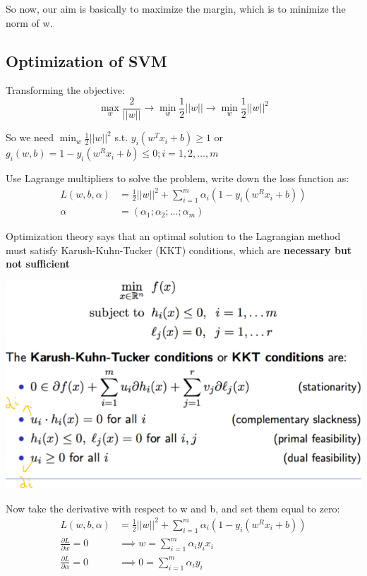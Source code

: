 \documentclass[letterpaper,12pt]{article}
\begin{document}
So now, our aim is basically to maximize the margin, which is to minimize the
norm of w.

\subsection{Optimization of SVM}

Transforming the objective:
\[
    \max_w\frac{2}{||w||}\to \min_w \frac{1}{2}||w|| \to \min_w \frac{1}{2}||w||^2
\]

So we need $\min_w \frac{1}{2}||w||^2$ s.t. $y_i(w^T x_i +b)\ge 1$ or $g_i
    (w,b) = 1 - y_i (w^R x_i +b)\le 0; i = 1,2,\ldots , m$

Use Lagrange multipliers to solve the problem, write down the loss function as:
\begin{align*}
    L(w,b,\alpha) & = \frac{1}{2}||w||^2 + \sum_{i=1}^{m}\alpha_i (1 - y_i (w^R x_i +b)) \\
    \alpha        & = (\alpha_1;\alpha_2;\ldots;\alpha_m)
\end{align*}

Optimization theory says that an optimal solution to the Lagrangian method must
satisfy Karush-Kuhn-Tucker (KKT) conditions, which are \textbf{necessary but
    not sufficient}

\includegraphics*{./Image/KKT conditions.png}

Now take the derivative with respect to w and b, and set them equal to zero:
\begin{align*}
    L(w,b,\alpha)                          & = \frac{1}{2}||w||^2 + \sum_{i=1}^{m}\alpha_i (1 - y_i (w^R x_i +b)) \\
    \frac{\partial L}{\partial w} = 0      & \implies w = \sum_{i=1}^{m}\alpha_i y_i x_i                          \\
    \frac{\partial L}{\partial \alpha} = 0 & \implies 0 = \sum_{i=1}^{m} \alpha_i y_i
\end{align*}
\end{document}
